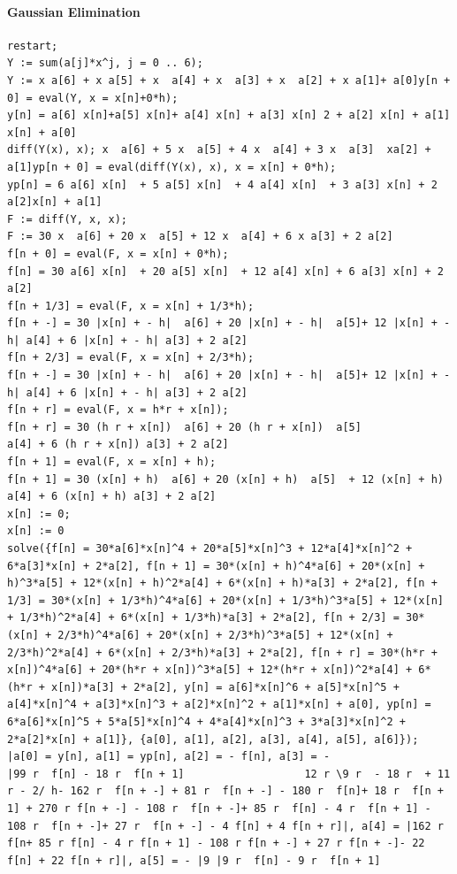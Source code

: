 \documentclass[12pt]{article}
\begin{document}
\paragraph{Gaussian Elimination}
\begin{verbatim}
restart;
Y := sum(a[j]*x^j, j = 0 .. 6);              
Y := x a[6] + x a[5] + x  a[4] + x  a[3] + x  a[2] + x a[1]+ a[0]y[n + 0] = eval(Y, x = x[n]+0*h);
y[n] = a[6] x[n]+a[5] x[n]+ a[4] x[n] + a[3] x[n] 2 + a[2] x[n] + a[1] x[n] + a[0]
diff(Y(x), x); x  a[6] + 5 x  a[5] + 4 x  a[4] + 3 x  a[3]  xa[2] + a[1]yp[n + 0] = eval(diff(Y(x), x), x = x[n] + 0*h);
yp[n] = 6 a[6] x[n]  + 5 a[5] x[n]  + 4 a[4] x[n]  + 3 a[3] x[n] + 2 a[2]x[n] + a[1]
F := diff(Y, x, x);                      
F := 30 x  a[6] + 20 x  a[5] + 12 x  a[4] + 6 x a[3] + 2 a[2]
f[n + 0] = eval(F, x = x[n] + 0*h);
f[n] = 30 a[6] x[n]  + 20 a[5] x[n]  + 12 a[4] x[n] + 6 a[3] x[n] + 2 a[2]
f[n + 1/3] = eval(F, x = x[n] + 1/3*h);  
f[n + -] = 30 |x[n] + - h|  a[6] + 20 |x[n] + - h|  a[5]+ 12 |x[n] + - h| a[4] + 6 |x[n] + - h| a[3] + 2 a[2]            
f[n + 2/3] = eval(F, x = x[n] + 2/3*h);      
f[n + -] = 30 |x[n] + - h|  a[6] + 20 |x[n] + - h|  a[5]+ 12 |x[n] + - h| a[4] + 6 |x[n] + - h| a[3] + 2 a[2]    
f[n + r] = eval(F, x = h*r + x[n]);
f[n + r] = 30 (h r + x[n])  a[6] + 20 (h r + x[n])  a[5]
a[4] + 6 (h r + x[n]) a[3] + 2 a[2]
f[n + 1] = eval(F, x = x[n] + h);   
f[n + 1] = 30 (x[n] + h)  a[6] + 20 (x[n] + h)  a[5]  + 12 (x[n] + h)  a[4] + 6 (x[n] + h) a[3] + 2 a[2]
x[n] := 0;
x[n] := 0
solve({f[n] = 30*a[6]*x[n]^4 + 20*a[5]*x[n]^3 + 12*a[4]*x[n]^2 + 6*a[3]*x[n] + 2*a[2], f[n + 1] = 30*(x[n] + h)^4*a[6] + 20*(x[n] + h)^3*a[5] + 12*(x[n] + h)^2*a[4] + 6*(x[n] + h)*a[3] + 2*a[2], f[n + 1/3] = 30*(x[n] + 1/3*h)^4*a[6] + 20*(x[n] + 1/3*h)^3*a[5] + 12*(x[n] + 1/3*h)^2*a[4] + 6*(x[n] + 1/3*h)*a[3] + 2*a[2], f[n + 2/3] = 30*(x[n] + 2/3*h)^4*a[6] + 20*(x[n] + 2/3*h)^3*a[5] + 12*(x[n] + 2/3*h)^2*a[4] + 6*(x[n] + 2/3*h)*a[3] + 2*a[2], f[n + r] = 30*(h*r + x[n])^4*a[6] + 20*(h*r + x[n])^3*a[5] + 12*(h*r + x[n])^2*a[4] + 6*(h*r + x[n])*a[3] + 2*a[2], y[n] = a[6]*x[n]^6 + a[5]*x[n]^5 + a[4]*x[n]^4 + a[3]*x[n]^3 + a[2]*x[n]^2 + a[1]*x[n] + a[0], yp[n] = 6*a[6]*x[n]^5 + 5*a[5]*x[n]^4 + 4*a[4]*x[n]^3 + 3*a[3]*x[n]^2 + 2*a[2]*x[n] + a[1]}, {a[0], a[1], a[2], a[3], a[4], a[5], a[6]});   
|a[0] = y[n], a[1] = yp[n], a[2] = - f[n], a[3] = -    
|99 r  f[n] - 18 r  f[n + 1]                   12 r \9 r  - 18 r  + 11 r - 2/ h- 162 r  f[n + -] + 81 r  f[n + -] - 180 r  f[n]+ 18 r  f[n + 1] + 270 r f[n + -] - 108 r  f[n + -]+ 85 r  f[n] - 4 r  f[n + 1] - 108 r  f[n + -]+ 27 r  f[n + -] - 4 f[n] + 4 f[n + r]|, a[4] = |162 r  f[n+ 85 r f[n] - 4 r f[n + 1] - 108 r f[n + -] + 27 r f[n + -]- 22 f[n] + 22 f[n + r]|, a[5] = - |9 |9 r  f[n] - 9 r  f[n + 1]                     

\end{verbatim}
\end{document}
